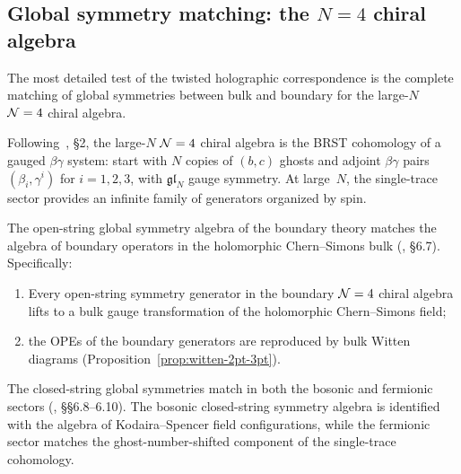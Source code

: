 \subsection{Global symmetry matching: the \texorpdfstring{$N\!=\!4$}{N=4} chiral algebra}
\label{subsec:n4-symmetry-matching}

The most detailed test of the twisted holographic correspondence is the
complete matching of global symmetries between bulk and boundary for the
large-$N$ $\N=4$ chiral algebra.

\begin{definition}[Large-$N$ $\N=4$ chiral algebra]
\label{def:large-n-n4-chiral}
Following~\cite{CG18}, \S2, the large-$N$ $\N=4$ chiral algebra is the
BRST cohomology of a gauged $\beta\gamma$ system: start with
$N$ copies of $(b,c)$ ghosts and adjoint $\beta\gamma$ pairs
$(\beta_i, \gamma^i)$ for $i = 1,2,3$, with $\mathfrak{gl}_N$ gauge
symmetry. At large~$N$, the single-trace sector provides an infinite
family of generators organized by spin.
\end{definition}

\begin{proposition}
\label{prop:open-string-matching}
The open-string global symmetry algebra of the boundary theory matches
the algebra of boundary operators in the holomorphic Chern--Simons bulk
\textup{(}\!\cite{CG18}, \S6.7\textup{)}. Specifically:
\begin{enumerate}[label=\textup{(\roman*)}]
\item Every open-string symmetry generator in the boundary $\N=4$
 chiral algebra lifts to a bulk gauge transformation of the
 holomorphic Chern--Simons field;
\item the OPEs of the boundary generators are reproduced by
 bulk Witten diagrams \textup{(}Proposition~\textup{\ref{prop:witten-2pt-3pt})}.
\end{enumerate}
\end{proposition}

\begin{proposition}
\label{prop:closed-string-matching}
The closed-string global symmetries match in both the bosonic and
fermionic sectors \textup{(}\!\cite{CG18}, \S\S6.8--6.10\textup{)}.
The bosonic closed-string symmetry algebra is identified with the
algebra of Kodaira--Spencer field configurations, while the fermionic
sector matches the ghost-number-shifted component of the single-trace
cohomology.
\end{proposition}

